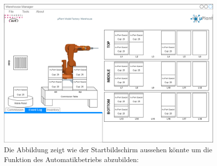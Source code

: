 \begin{figure}
        \caption[Mockup des Startbildschirms]
        {\small Die Abbildung zeigt wie der Startbildschirm aussehen könnte um die Funktion des Automatikbetriebs abzubilden:
        }\label{fig:figure11}
        \includegraphics[width = \textwidth ]{Bilder/Mockup_Startbildschirm}
        \centering
\end{figure}

